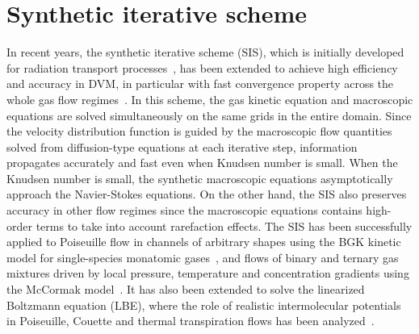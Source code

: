\section{Synthetic iterative scheme}


In recent years, the synthetic iterative scheme (SIS), which is initially developed for radiation transport processes~\cite{DSA2002}, has been extended to achieve high efficiency and accuracy in DVM, in particular with fast convergence property across the whole gas flow regimes~\cite{Valougeorgis:2003zr,Lihnaropoulos2007}. In this scheme, the gas kinetic equation and macroscopic equations are solved simultaneously on the same grids in the entire domain. Since the velocity distribution function is guided by the macroscopic flow quantities solved from diffusion-type equations at each iterative step, information propagates accurately and fast even when Knudsen number is small. When the Knudsen number is small, the synthetic macroscopic equations asymptotically approach the Navier-Stokes equations. On the other hand, the SIS also preserves accuracy in other flow regimes since the macroscopic equations contains high-order terms to take into account rarefaction effects. The SIS has been successfully applied to Poiseuille flow in channels of arbitrary shapes using the BGK kinetic model for single-species monatomic gases~\cite{SZALMAS20104315}, and flows of binary and ternary gas mixtures driven by local pressure, temperature and concentration gradients using the McCormak model~\cite{NARIS2004629,NARIS2004294,Naris2005Pof,SZALMAS201691}. It has also been extended to solve the linearized Boltzmann equation (LBE), where the role of realistic intermolecular potentials in Poiseuille, Couette and thermal transpiration flows has been analyzed~\cite{LeiJCP2017,SU2019573}.


